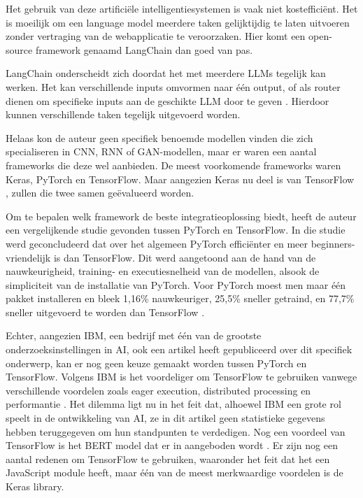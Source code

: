 \documentclass[dutch]{hogent-article}
\begin{document}
Het gebruik van deze artificiële intelligentiesystemen is vaak niet kostefficiënt. Het is moeilijk om een language model meerdere taken gelijktijdig te laten uitvoeren zonder vertraging van de webapplicatie te veroorzaken. Hier komt een open-source framework genaamd LangChain dan goed van pas.

LangChain onderscheidt zich doordat het met meerdere LLMs tegelijk kan werken. Het kan verschillende inputs omvormen naar één output, of als router dienen om specifieke inputs aan de geschikte LLM door te geven \autocite{Topsakal2023CreatingLL}. Hierdoor kunnen verschillende taken tegelijk uitgevoerd worden.

Helaas kon de auteur geen specifiek benoemde modellen vinden die zich specialiseren in CNN, RNN of GAN-modellen, maar er waren een aantal frameworks die deze wel aanbieden. De meest voorkomende frameworks waren Keras, PyTorch en TensorFlow. Maar aangezien Keras nu deel is van TensorFlow \autocite{TensorFlow2023}, zullen die twee samen geëvalueerd worden.

Om te bepalen welk framework de beste integratieoplossing biedt, heeft de auteur een vergelijkende studie gevonden tussen PyTorch en TensorFlow. In die studie werd geconcludeerd dat over het algemeen PyTorch efficiënter en meer beginners-vriendelijk is dan TensorFlow. Dit werd aangetoond aan de hand van de nauwkeurigheid, training- en executiesnelheid van de modellen, alsook de simpliciteit van de installatie van PyTorch. Voor PyTorch moest men maar één pakket installeren en bleek 1,16\% nauwkeuriger, 25,5\% sneller getraind, en 77,7\% sneller uitgevoerd te worden dan TensorFlow \autocite{Novac2022AnalysisOT}.

Echter, aangezien IBM, een bedrijf met één van de grootste onderzoeksinstellingen in AI, ook een artikel heeft gepubliceerd over dit specifiek onderwerp, kan er nog geen keuze gemaakt worden tussen PyTorch en TensorFlow. Volgens IBM is het voordeliger om TensorFlow te gebruiken vanwege verschillende voordelen zoals eager execution, distributed processing en performantie \autocite{Madhavan2021}. Het dilemma ligt nu in het feit dat, alhoewel IBM een grote rol speelt in de ontwikkeling van AI, ze in dit artikel geen statistieke gegevens hebben teruggegeven om hun standpunten te verdedigen. Nog een voordeel van TensorFlow is het BERT model dat er in aangeboden wordt \autocite{TensorFlow2023BERT}. Er zijn nog een aantal redenen om TensorFlow te gebruiken, waaronder het feit dat het een JavaScript module heeft, maar één van de meest merkwaardige voordelen is de Keras library.
\end{document}
